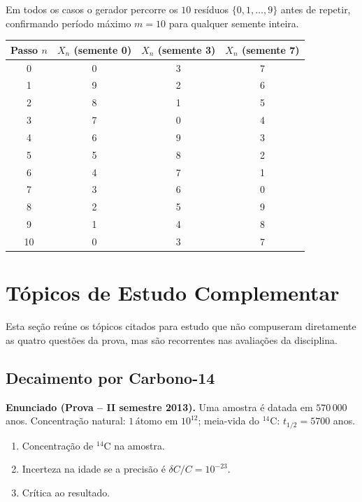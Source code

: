 \documentclass[12pt,a4paper]{article}
\theoremstyle{definition}
\begin{document}
Em todos os casos o gerador percorre os $10$ res\'iduos $\{0,1,\ldots,9\}$ antes de repetir,
confirmando per\'iodo m\'aximo $m = 10$ para qualquer semente inteira.

\begin{center}
\begin{tabular}{cccc}
\toprule
Passo $n$ & $X_n$ (semente 0) & $X_n$ (semente 3) & $X_n$ (semente 7) \\
\midrule
0 & 0 & 3 & 7 \\
1 & 9 & 2 & 6 \\
2 & 8 & 1 & 5 \\
3 & 7 & 0 & 4 \\
4 & 6 & 9 & 3 \\
5 & 5 & 8 & 2 \\
6 & 4 & 7 & 1 \\
7 & 3 & 6 & 0 \\
8 & 2 & 5 & 9 \\
9 & 1 & 4 & 8 \\
10 & 0 & 3 & 7 \\
\bottomrule
\end{tabular}
\end{center}

\newpage
\section{T\'opicos de Estudo Complementar}

Esta se\c{c}\~ao re\'une os t\'opicos citados para estudo que n\~ao compuseram diretamente
as quatro quest\~oes da prova, mas s\~ao recorrentes nas avalia\c{c}\~oes da disciplina.

\subsection{Deca\-imento por Carbono-14}

\textbf{Enunciado (Prova -- II\textordmasculine{} semestre 2013).}
Uma amostra \'e datada em $570\,000$ anos. Concentra\c{c}\~ao natural: $1\,\text{\'atomo em }10^{12}$;
meia-vida do ${}^{14}$C: $t_{1/2} = 5700$ anos.
\begin{enumerate}[label=\alph*)]
  \item Concentra\c{c}\~ao de ${}^{14}$C na amostra.
  \item Incerteza na idade se a precis\~ao \'e $\delta C/C = 10^{-23}$.
  \item Cr\'itica ao resultado.
\end{enumerate}
\end{document}
